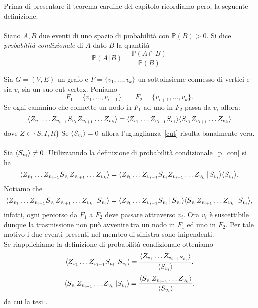 Prima di presentare il teorema cardine del capitolo  
ricordiamo pero, la seguente definizione.\\ \\
Siano $A,B$ due eventi di uno spazio di probabilit\`a con $\mathbb{P}(B)>0$. Si dice \textit{probabilit\`a condizionale} di $A$ dato $B$ la quantit\`a 
\begin{equation} 
\label{p_con}
\mathbb{P}(A\, \vert B) = \frac{ \mathbb{P}(A\cap B)}{\mathbb{P}(B)}
\end{equation}

\begin{thm}\label{th_cut-vertex}
Sia $G=(V,E)$ un grafo e $F=\{ v_1, \dots, v_k\}$ un sottoinsieme connesso di vertici e sia $v_i$ sia un suo cut-vertex. Poniamo  $$ F_1 = \{ v_1, \dots, v_{i-1}\} \qquad F_2 =\{ v_{i+1}, \dots, v_k\}.$$ 
Se ogni cammino che connette un nodo in $F_1$ ad uno in $F_2$ passa da $v_i$ allora: 
\begin{equation}\label{cut}\langle  Z_{v_1}\dots Z_{v_{i-1}} S_{v_i} Z_{v_{i+1}} \dots Z_{v_k} \rangle = \langle  Z_{v_1}\dots Z_{v_{i-1}} S_{v_i} \rangle \langle S_{v_i}  Z_{v_{i+1}} \dots Z_{v_k} \rangle	
\end{equation}
dove $Z\in \{ S,I,R\}$ 
\proof  
Se $\langle S_{v_i} \rangle=0$ allora l'uguaglianza~\eqref{cut} risulta banalmente vera.\\ \\ 
Sia $\langle S_{v_i} \rangle\neq 0 $. Utilizzanndo la definizione di  probabilit\`a condizionale~\eqref{p_con}  si ha 
$$ \langle  Z_{v_1}\dots Z_{v_{i-1}} S_{v_i} Z_{v_{i+1}}\dots Z_{v_k} \rangle = \langle  Z_{v_1}\dots Z_{v_{i-1}} S_{v_i} Z_{v_{i+1}}\dots Z_{v_k}\, \vert \, S_{v_i} \rangle \langle S_{v_i} \rangle.$$
Notiamo che $$ \langle  Z_{v_1}\dots Z_{v_{i-1}} S_{v_i} Z_{v_{i+1}}\dots Z_{v_k}\, \vert \, S_{v_i} \rangle = \langle  Z_{v_1}\dots Z_{v_{i-1}} S_{v_i} \, \vert\, S_{v_i} \rangle \langle S_{v_i}Z_{v_{i+1}}\dots Z_{v_k}\, \vert \, S_{v_i} \rangle,$$ 
infatti, ogni percorso da $F_1$ a $F_2$ deve passare attraverso $v_i$. Ora  $v_i$ \`e suscettibile dunque la trasmissione non pu\`o avvenire tra un nodo in $F_1$ ed uno in $F_2$. Per tale motivo i due eventi presenti nel membro di sinistra sono inipendenti.\\
Se riapplichiamo la definizione di probabilit\`a condizionale otteniamo  
$$ \langle  Z_{v_1} \dots Z_{v_{i-1}}S_{v_i} \, \vert S_{v_i} \rangle =\frac{ \langle Z_{v_1} \dots Z_{v_{i-1} S_{v_i}} \rangle}{\langle  S_{v_i} \rangle},$$
$$ \langle  S_{v_i} Z_{v_{i+1}}\dots Z_{v_{k}} \, \vert S_{v_i} \rangle =\frac{ \langle S_{v_i}Z_{v_{i+1}} \dots Z_{v_{k}} \rangle}{\langle  S_{v_i} \rangle}.$$
da cui la tesi .
\endproof
\end{thm}


